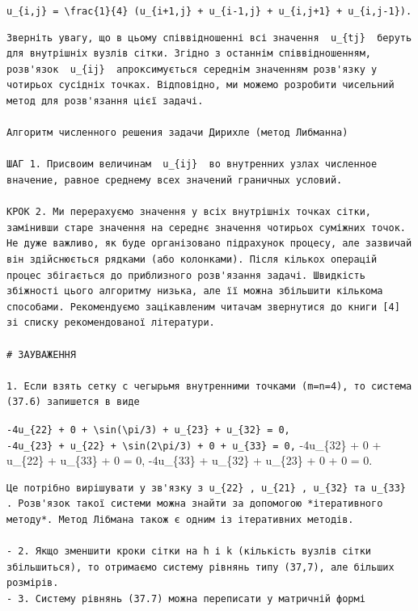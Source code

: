 \documentclass[
  ukrainian,
]{article}
\begin{document}
\texttt{u\_\{i,j\}\ =\ \textbackslash{}frac\{1\}\{4\}\ (u\_\{i+1,j\}\ +\ u\_\{i-1,j\}\ +\ u\_\{i,j+1\}\ +\ u\_\{i,j-1\}).}

\begin{verbatim}
Зверніть увагу, що в цьому співвідношенні всі значення  u_{tj}  беруть для внутрішніх вузлів сітки. Згідно з останнім співвідношенням, розв'язок  u_{ij}  апроксимується середнім значенням розв'язку у чотирьох сусідніх точках. Відповідно, ми можемо розробити чисельний метод для розв'язання цієї задачі.

Алгоритм численного решения задачи Дирихле (метод Либманна)

ШАГ 1. Присвоим величинам  u_{ij}  во внутренних узлах численное вначение, равное среднему всех значений граничных условий.

КРОК 2. Ми перерахуємо значення у всіх внутрішніх точках сітки, замінивши старе значення на середнє значення чотирьох суміжних точок. Не дуже важливо, як буде організовано підрахунок процесу, але зазвичай він здійснюється рядками (або колонками). Після кількох операцій процес збігається до приблизного розв'язання задачі. Швидкість збіжності цього алгоритму низька, але її можна збільшити кількома способами. Рекомендуємо зацікавленим читачам звернутися до книги [4] зі списку рекомендованої літератури.

# ЗАУВАЖЕННЯ

1. Если взять сетку с чегырьмя внутренними точками (m=n=4), то система (37.6) запишется в виде
\end{verbatim}

\texttt{-4u\_\{22\}\ +\ 0\ +\ \textbackslash{}sin(\textbackslash{}pi/3)\ +\ u\_\{23\}\ +\ u\_\{32\}\ =\ 0,}
\texttt{-4u\_\{23\}\ +\ u\_\{22\}\ +\ \textbackslash{}sin(2\textbackslash{}pi/3)\ +\ 0\ +\ u\_\{33\}\ =\ 0,}
-4u\_\{32\} + 0 + u\_\{22\} + u\_\{33\} + 0 = 0, -4u\_\{33\} + u\_\{32\}
+ u\_\{23\} + 0 + 0 = 0.

\begin{verbatim}
Це потрібно вирішувати у зв'язку з u_{22} , u_{21} , u_{32} та u_{33} . Розв'язок такої системи можна знайти за допомогою *ітеративного методу*. Метод Лібмана також є одним із ітеративних методів.

- 2. Якщо зменшити кроки сітки на h і k (кількість вузлів сітки збільшиться), то отримаємо систему рівнянь типу (37,7), але більших розмірів.
- 3. Систему рівнянь (37.7) можна переписати у матричній формі
\end{verbatim}
\end{document}
